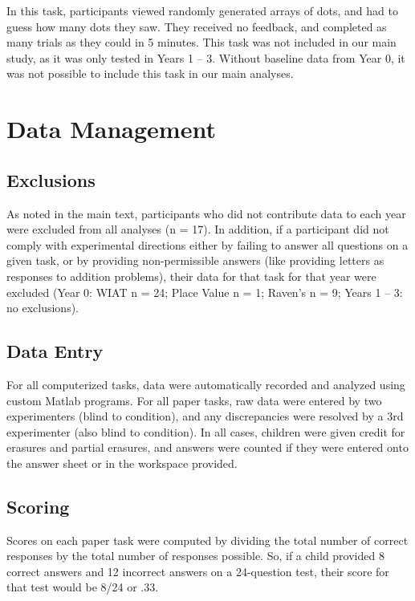 \documentclass[11pt]{article}
\begin{document}
In this task, participants viewed randomly generated arrays of dots, and had to guess how many dots they saw. They received no feedback, and completed as many trials as they could in 5 minutes. This task was not included in our main study, as it was only tested in Years 1 -- 3. Without baseline data from Year 0, it was not possible to include this task in our main analyses.

\section{Data Management}

\subsection{Exclusions}

As noted in the main text, participants who did not contribute data to each year were excluded from all analyses (n = 17). In addition, if a participant did not comply with experimental directions either by failing to answer all questions on a given task, or by providing non-permissible answers (like providing letters as responses to addition problems), their data for that task for that year were excluded (Year 0: WIAT n = 24; Place Value n = 1; Raven's n = 9; Years 1 -- 3: no exclusions).

\subsection{Data Entry}

For all computerized tasks, data were automatically recorded and analyzed using custom Matlab programs. For all paper tasks, raw data were entered by two experimenters (blind to condition), and any discrepancies were resolved by a 3rd experimenter (also blind to condition). In all cases, children were given credit for erasures and partial erasures, and answers were counted if they were entered onto the answer sheet or in the workspace provided. 

\subsection{Scoring}

Scores on each paper task were computed by dividing the total number of correct responses by the total number of responses possible. So, if a child provided 8 correct answers and 12 incorrect answers on a 24-question test, their score for that test would be 8/24 or .33. 
\end{document}
